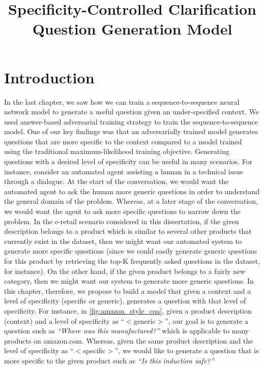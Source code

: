 \documentclass[11pt,a4paper]{article}
\title{Specificity-Controlled Clarification Question Generation Model}
\date{}
\begin{document}
\maketitle
\begin{abstract}

\end{abstract}

\section{Introduction}

In the last chapter, we saw how we can train a sequence-to-sequence neural network model to generate a useful question given an under-specified context. 
We used answer-based adversarial training strategy to train the sequence-to-sequence model. One of our key findings was that an adversarially trained model generates questions that are more specific to the context compared to a model trained using the traditional maximum-likelihood training objective.
Generating questions with a desired level of specificity can be useful in many scenarios.
For instance, consider an automated agent assisting a human in a technical issue through a dialogue. 
At the start of the conversation, we would want the automated agent to ask the human more generic questions in order to understand the general domain of the problem. Whereas, at a later stage of the conversation, we would want the agent to ask more specific questions to narrow down the problem. 
In the e-retail scenario considered in this dissertation,  if the given description belongs to a product which is similar to several other products that currently exist in the dataset, then we might want our automated system to generate more specific questions (since we could easily generate generic questions for this product by retrieving the top-K frequently asked questions in the dataset, for instance).
On the other hand, if the given product belongs to a fairly new category, then we might want our system to generate more generic questions. 
In this chapter, therefore, we propose to build a model that given a context and a level of specificity (specific or generic), generates a question with that level of specificity.
For instance, in \autoref{fig:amazon_style_cqa}, given a product description (context) and a level of specificity as ``$<$generic$>$'', our goal is to generate a question such as \textit{``Where was this manufactured?''} which is applicable to many products on amazon.com. 
Whereas, given the same product description and the level of specificity as ``$<$specific$>$'', we would like to generate a question that is more specific to the given product such as \textit{``Is this induction safe?''}
\end{document}
